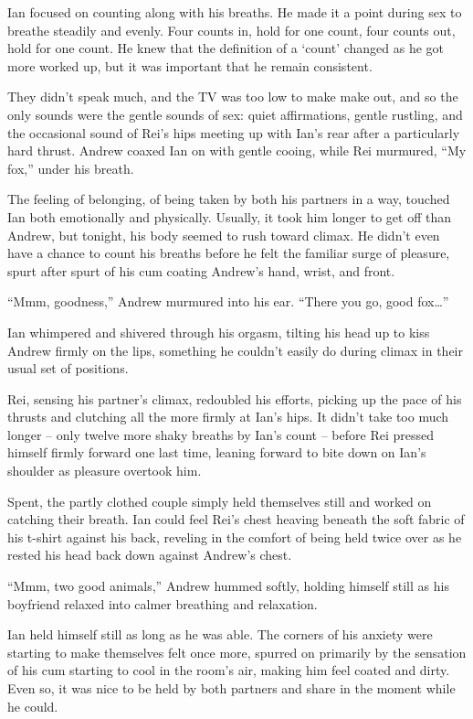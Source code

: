 \documentclass[12pt,letterpaper,oneside]{memoir}
\begin{document}
  Ian focused on counting along with his breaths. He made it a point during sex to breathe steadily and evenly. Four counts in, hold for one count, four counts out, hold for one count. He knew that the definition of a `count' changed as he got more worked up, but it was important that he remain consistent.

  They didn't speak much, and the TV was too low to make make out, and so the only sounds were the gentle sounds of sex: quiet affirmations, gentle rustling, and the occasional sound of Rei's hips meeting up with Ian's rear after a particularly hard thrust. Andrew coaxed Ian on with gentle cooing, while Rei murmured, ``My fox,'' under his breath.

  The feeling of belonging, of being taken by both his partners in a way, touched Ian both emotionally and physically. Usually, it took him longer to get off than Andrew, but tonight, his body seemed to rush toward climax. He didn't even have a chance to count his breaths before he felt the familiar surge of pleasure, spurt after spurt of his cum coating Andrew's hand, wrist, and front.

  ``Mmm, goodness,'' Andrew murmured into his ear. ``There you go, good fox\ldots{}''

  Ian whimpered and shivered through his orgasm, tilting his head up to kiss Andrew firmly on the lips, something he couldn't easily do during climax in their usual set of positions.

  Rei, sensing his partner's climax, redoubled his efforts, picking up the pace of his thrusts and clutching all the more firmly at Ian's hips. It didn't take too much longer -- only twelve more shaky breaths by Ian's count -- before Rei pressed himself firmly forward one last time, leaning forward to bite down on Ian's shoulder as pleasure overtook him.

  Spent, the partly clothed couple simply held themselves still and worked on catching their breath. Ian could feel Rei's chest heaving beneath the soft fabric of his t-shirt against his back, reveling in the comfort of being held twice over as he rested his head back down against Andrew's chest.

  ``Mmm, two good animals,'' Andrew hummed softly, holding himself still as his boyfriend relaxed into calmer breathing and relaxation.

  Ian held himself still as long as he was able. The corners of his anxiety were starting to make themselves felt once more, spurred on primarily by the sensation of his cum starting to cool in the room's air, making him feel coated and dirty. Even so, it was nice to be held by both partners and share in the moment while he could.
\end{document}
